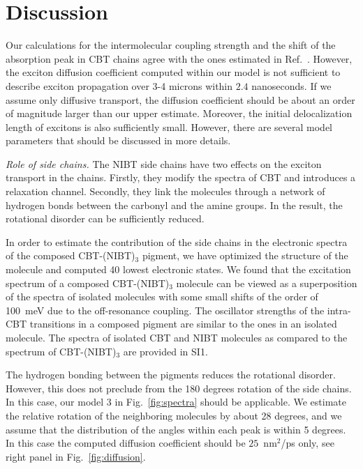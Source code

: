\documentclass[journal=jacs,manuscript=article]{achemso}
\begin{document}
\section{Discussion}
Our calculations for the intermolecular coupling strength and the shift of the absorption peak in CBT chains agree with the ones estimated in Ref.~\cite{Haedler2015}. However, the exciton diffusion coefficient computed within our model is not sufficient to describe exciton propagation over 3-4 microns within $2.4$ nanoseconds. If we assume only diffusive transport, the diffusion coefficient should be about an order of magnitude larger than our upper estimate. Moreover, the initial delocalization length of excitons is also sufficiently small. However, there are several model parameters that should be discussed in more details.

\textit{Role of side chains.} The NIBT side chains have two effects on the exciton transport in the chains. Firstly, they modify the spectra of CBT and introduces a relaxation channel. Secondly, they link the molecules through a network of hydrogen bonds between the carbonyl and the amine groups. In the result, the rotational disorder can be sufficiently reduced.

In order to estimate the contribution of the side chains in the electronic spectra of the composed CBT-(NIBT)$_3$ pigment, we have optimized the structure of the molecule and computed 40 lowest electronic states. We found that the excitation spectrum of a composed CBT-(NIBT)$_3$ molecule can be viewed as a superposition of the spectra of isolated molecules with some small shifts of the order of 100~meV due to the off-resonance coupling. The oscillator strengths of the intra-CBT transitions in a composed pigment are similar to the ones in an isolated molecule. The spectra of isolated CBT and NIBT molecules as compared to the spectrum of CBT-(NIBT)$_3$ are provided in SI1.

The hydrogen bonding between the pigments reduces the rotational disorder. However, this does not preclude from the 180 degrees rotation of the side chains. In this case, our model 3 in Fig.~\ref{fig:spectra} should be applicable. We estimate the relative rotation of the neighboring molecules by about 28 degrees, and we assume that the distribution of the angles within each peak is within 5 degrees. In this case the computed diffusion coefficient should be $25$~nm$^2$/ps only, see right panel in Fig.~\ref{fig:diffusion}.
\end{document}
